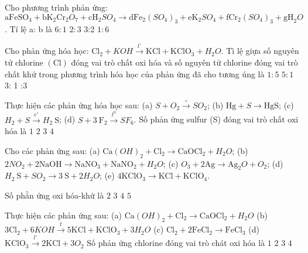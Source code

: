 \begin{ex}[Đề TSĐH A-2013]
	Cho phương trình phản ứng:
	$\mathrm{aFeSO}_4+\mathrm{bK}_2\mathrm{Cr}_2O_7+\mathrm{cH}_2SO_4\to \mathrm{dFe}_2\left(SO_4\right)_3+\mathrm{eK}_2SO_4+\mathrm{fCr}_2\left(SO_4\right)_3+\mathrm{gH}_2O$. Tí lệ a: b là
	\choice
	{$6: 1$}
	{$2: 3$}
	{3:2}
	{\True $1: 6$}
	\loigiai{}
\end{ex}

\begin{ex}[Đề TSCD-2012]
	Cho phản ứng hóa học: $\mathrm{Cl}_2+KOH \xrightarrow{t^{\circ}} \mathrm{KCl}+\mathrm{KClO}_3+H_2O$. Tì lệ giựa số nguyên tử chlorine $(\mathrm{Cl})$ đóng vai trò chất oxi hóa và số nguyên tử chlorine đóng vai trò chất khử trong phương trình hóa học của phản ứng đã cho tương úng là
	\choice
	{$1: 5$}
	{$5: 1$}
	{3: 1}
	{:3}
	\loigiai{}
\end{ex}

\begin{ex}Thực hiện các phản ửng hóa học sau:
	(a) $S+O_2\xrightarrow{\circ} SO_2$;
	(b) $\mathrm{Hg}+S\to \mathrm{HgS}$;
	(c) $H_2+S \xrightarrow{e^{\circ}} H_2\mathrm{~S}$;
	(d) $S+3\mathrm{~F}_2\xrightarrow{t^0} SF_6$.
	Số phản ứng sulfur (S) đóng vai trò chất oxi hóa là
	\choice
	{\True $1$}
	{$2$}
	{$3$}
	{$4$}
\end{ex}

\begin{ex}Cho cảc phản ứng sau:
	(a) $\mathrm{Ca}(OH)_2+\mathrm{Cl}_2 \to \mathrm{CaOCl}_2+H_2O$;
	(b) $2 NO_2+2 \mathrm{NaOH} \to \mathrm{NaNO}_3+\mathrm{NaNO}_2+H_2O$;
	(c) $O_3+2\mathrm{Ag} \to \mathrm{Ag}_2O+O_2$;
	(d) $H_2\mathrm{~S}+SO_2 \to 3 \mathrm{~S}+2 H_2O$;
	(e) $4\mathrm{KClO}_3\to \mathrm{KCl}+\mathrm{KClO}_4$.
	
	Số phằn ứng oxi hóa-khứ là
	\choice
	{$2$}
	{\True $3$}
	{$4$}
	{$5$}
\end{ex}

\begin{ex}Thực hiện các phản ứng sau:
	(a) $\mathrm{Ca}(OH)_2+\mathrm{Cl}_2 \to \mathrm{CaOCl}_2+H_2O$
	(b) $3 \mathrm{Cl}_2+6 KOH \xrightarrow{t} 5 \mathrm{KCl}+\mathrm{KClO}_3+3 H_2O$
	(c) $\mathrm{Cl}_2+2\mathrm{FeCl}_2\to \mathrm{FeCl}_3$
	(d) $\mathrm{KClO}_3\xrightarrow{l^{\circ}} 2\mathrm{KCl}+3O_2$
	Số phản ứng chlorine đóng vai trò chát oxi hóa là
	\choice
	{$1$}
	{\True $2$}
	{$3$}
	{$4$}
\end{ex}

